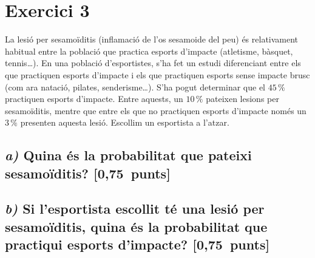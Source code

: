 \documentclass[11pt,a4paper]{article}
\begin{document}
\section*{\textcolor{blauPista}{Exercici 3}}

\noindent La lesió per sesamoïditis (inflamació de l'os sesamoide del peu) és relativament habitual entre la població que practica esports d'impacte (atletisme, bàsquet, tennis\ldots). En una població d'esportistes, s'ha fet un estudi diferenciant entre els que practiquen esports d'impacte i els que practiquen esports sense impacte brusc (com ara natació, pilates, senderisme\ldots). S'ha pogut determinar que el $45\,\%$ practiquen esports d'impacte. Entre aquests, un $10\,\%$ pateixen lesions per sesamoïditis, mentre que entre els que no practiquen esports d'impacte només un $3\,\%$ presenten aquesta lesió. Escollim un esportista a l'atzar.

\subsection*{\textit{a)} \normalfont Quina és la probabilitat que pateixi sesamoïditis? \hspace*{\fill}\textnormal{[0,75~punts]}}


\subsection*{\textit{b)} \normalfont Si l'esportista escollit té una lesió per sesamoïditis, quina és la probabilitat que practiqui esports d'impacte? \hspace*{\fill}\textnormal{[0,75~punts]}}

\end{document}
